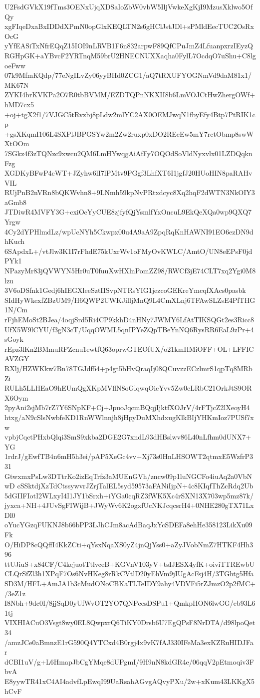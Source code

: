 U2FsdGVkX19fTms3OENxUjqXDSaIoZbW0vbW5IljVwkeXgKjI9MzusXklwo5OfQy
xgFIqeDxaBxIDDdXPmN0opGlxKEQLTN2s6gHClJstJDl+sPMldEecTUC2OsRxOcG
yYfEASiTxNfrEQqZ15IOI9nLRVB1F6n832arpwF89QfCPuJmZ4LfuanpxrzIEyzQ
RGHpGK+aYBvcF2YRTnqM59brU2HNECNUXXaqha0FylL7OcdqO7uShu+C8lgoeFww
07k9MfmKQdp/77eNgILvZy06yyBHd0ZCG1/aQ7tRXUFYOGNmVd9daM81x1/MK67N
ZYKI4brKVKPa2O7R0tbBVMM/EZDTQPnNKXII8b6LmVOJCtHwZhergOWf+hMD7cx5
+oj+tgX2f1/7VJGC5tRvzbj8pLdw2mlYC2AX0OEMJwqN1fbyEfy4Btp7PtRIK1cp
+gsXKqmI106L4SXPlJBPGSYw2m2Zw2ruxp0xDO2REeEw5mY7rctObmp8swWXtOOm
7SGkz4f3zTQNzc9xwcu2QM6LmHYwqgAiAfFy7OQOdSoVldNyxvlx01LZDQqknFzg
XGDKyBFwP4cWT+JZyhw6lI7lPMtv9PGgf3LhfXT6I1jgfJ20HUoHIN8paRAHvVIL
RUjPnB2nVRn8bQKWvhn8+9LNmh59kpNvPRtxdcyc8Xq2hqF2dWTN3NkOIY3aGmb8
JTDiwR4MVFY3G+cxiOcYyCUE8zjfyfQjYsmlfYxOncuL9EkQeXQa0wp9QXQ7Yrgw
4Cy2dYPHlmdLz/wpUcNYh5Ckwpx00u4A9aA9ZpqRqKnHAWNI91EO6ezDN9dhKuch
6SApdxL+/vtJlw3K1I7rFhdE75kUxrWv1oFMyOvKWLC/AmtO/UN8eEPsF0jdPYk1
NPazyMr83jQVWYN5Hr0uT0fuuXwHXlnPomZZ98/RWCf3jE74CLT7xq2Ygi0M8lzu
3V6oDSfnk1Gedj6hIEGXleeSztIISvpNTRsYIG1jezcoGEKreYmcqfXAcs0pasbk
SIdHyWkexfZBzUM9/H6QWP2UWKJilljMnQ9L4CmXLnj6TFAwSLZsE4PfTHG1N/Cm
rFjhEMoSt2BJea/4oqjSrd5Ri4CP9kkhD4nHNy7JWMY6LfAtTIKSQGt2es3Ricc8
UfX5W9lCYU/f3gN3cT/UqqOWML5qnIPYeZQpTBeYnNQ6RysRR6EaL9zPr+4sGoyk
rEpz3lKn2BMmuRPZcnu1ewtfQ63oprwGTEOfUX/o21kmHMiOFF+OL+LFFICAVZGY
RXlj/HZWKkw7Bn78TGJdf54+p4gt5bHvQraqIj08QCuvzzECzlmrS1qpTq8MRbZi
RULh5LLHEaO9hEUmQgXKpMVflN8oGlqwqOicYvv5Zw0eLRbC21OrkJtS9ORX6Oym
2pyAni2sjMb7rZ7Y6SNpKF+Cj+JpuoJqcmBQqjIjktfXOJrV/4rFTjcZ2lXeoyH4
htxg/aN9cSlsNwbfeKD1RnWWlnnjh8jHpyDuMXhdxugKlkBIjYHKmIoz7PUSf7xw
vpbjCqctPHxbQlqi3SmS9xkba2DGE2G7xndL93dHBslwv86L40nLfhm0dUNX7+YG
1rdrJ/gEwfTB4n6mH5h3ei/pAP5XeGc4vv+Xj73s0HnLHSOWT2qtmxE5WzfrP331
GtwxmxPsLw3DTtrKo2izEqTrfz3aMUEnGVh/zncw09p1luNGCFo4iuAq2a0VbNwD
cSSktdjXzTdCtssywvrJZrjTalEL5syd59573aFANiIjpN+4c8KIqfThZcRdq2Ub
5dGIIFIotI2WLxyI4I1JY1bSrxh+iYGa0cqRZ3fWK5Xc4rSXN13X703wp5mz87k/
jyxca+NH+4JUvSgFIWijB+JWyWv6K2ogxfUcNKJcqcsrH4+0NHE280gTX71LxDl0
oYucYGzqFUKNJ8b66bPP3LJhCJm8acAdBaqJxYcSDEFa8ehHe358123LikXu09Fk
O/HiDP8cQQffI4KkZCti+qYsxNqaXS0yZ4jnQjYss0+aZyJVobNmZ7HTKF4Hh396
ttUJiuS+x84CF/C4kejuotTtlvceB+KGVnV103yV+tsIJESX4yfK+oiviTTREwbU
CLQrSfZl3h1XPqF7Os6NvHKeg8rRkCVtlD20yEhVm9jIUgAcFsj4H/3TGhtg5Hfa
SD3M/HFL+AmJA1b3cMudONoCBKaTLTeIDY9ahy4VDVFi5rZJmzO2p2fMC+/3eZ1z
I8Nbh+9dc0I/8jjSqD0yUfWvOT2YO7QNPcesDSPu1+QmkpHON6lwGG/eb93L61tj
VIXHIACuO3Vsgt8wy0EL8QwpxrQ6TiKY0Drsb6U7EgQPsF8NrDTA/d98lpoQet34
/amzJCe0aBmnzE1rG590Q4YTCxd4B0rgj4x9vK7fAJ330IFeMa3exKZRuHIDJFar
dCBI1uV/g+L6HmapJbCgYMqe8dUPgmI/9H9nN8kdGR4e/06qqV2pEtmoqiv3FbvA
E8yywTR41xC4AI4advfLpEwqI99UaRsahAGvgAQvyPXu/2w+xKum43LKKgX5hCvF
